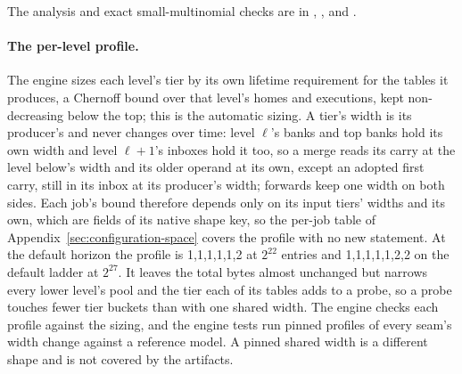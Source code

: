 \documentclass[11pt]{article}
\theoremstyle{definition}
\theoremstyle{remark}
\begin{document}
The analysis and exact small-multinomial checks are in
, , and
.

\paragraph{The per-level profile.} The engine sizes each level's tier by
its own lifetime requirement for the tables it produces, a Chernoff bound
over that level's homes and executions, kept non-decreasing below the top;
this is the automatic sizing. A tier's width is its producer's and never
changes over time: level $\ell$'s banks and top banks hold its own width
and level $\ell+1$'s inboxes hold it too, so a merge reads its carry at the
level below's width and its older operand at its own, except an adopted
first carry, still in its inbox at its producer's width; forwards keep one
width on both sides. Each job's bound therefore depends only on its input
tiers' widths and its own, which are fields of its native shape key, so
the per-job table of Appendix~\ref{sec:configuration-space} covers the
profile with no new statement. At the default horizon the profile is
1,1,1,1,1,2 at $2^{22}$ entries and 1,1,1,1,1,2,2 on the default ladder at
$2^{27}$. It leaves the total bytes almost unchanged but narrows every lower
level's pool and the tier each of its tables adds to a probe, so a probe
touches fewer tier buckets than with one shared width. The
engine checks each profile against the sizing, and the engine tests run
pinned profiles of every seam's width change against a reference model.
A pinned shared width is a different shape and is not covered by the
artifacts.
\end{document}
